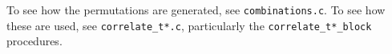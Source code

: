 \documentclass{article}
\newcommand{\correlate}{\texttt{correlate}}
\newcommand{\gn}[1]{\ensuremath{g^{(#1)}}}
\newcommand{\Time}{\ensuremath{\mathcal{T}}}
\newcommand{\photon}{\ensuremath{\gamma}}
\begin{document}
To see how the permutations are generated, see \texttt{combinations.c}. To see how these are used, see \texttt{correlate\_t*.c}, particularly the \texttt{correlate\_t*\_block} procedures.
%
%
\end{document}
